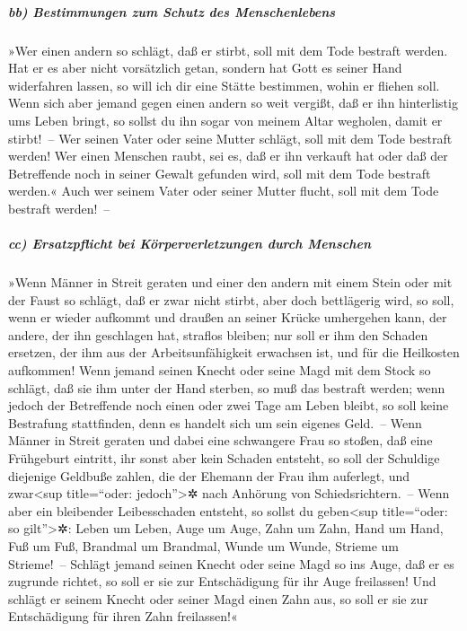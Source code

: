 \hypertarget{bb-bestimmungen-zum-schutz-des-menschenlebens}{%
\subparagraph{bb) Bestimmungen zum Schutz des
Menschenlebens}\label{bb-bestimmungen-zum-schutz-des-menschenlebens}}

 »Wer einen andern so schlägt, daß er stirbt, soll mit
dem Tode bestraft werden.  Hat er es aber nicht
vorsätzlich getan, sondern hat Gott es seiner Hand widerfahren lassen,
so will ich dir eine Stätte bestimmen, wohin er fliehen soll.
 Wenn sich aber jemand gegen einen andern so weit
vergißt, daß er ihn hinterlistig ums Leben bringt, so sollst du ihn
sogar von meinem Altar wegholen, damit er stirbt!~--  Wer
seinen Vater oder seine Mutter schlägt, soll mit dem Tode bestraft
werden!  Wer einen Menschen raubt, sei es, daß er ihn
verkauft hat oder daß der Betreffende noch in seiner Gewalt gefunden
wird, soll mit dem Tode bestraft werden.«  Auch wer
seinem Vater oder seiner Mutter flucht, soll mit dem Tode bestraft
werden!~--

\hypertarget{cc-ersatzpflicht-bei-kuxf6rperverletzungen-durch-menschen}{%
\subparagraph{cc) Ersatzpflicht bei Körperverletzungen durch
Menschen}\label{cc-ersatzpflicht-bei-kuxf6rperverletzungen-durch-menschen}}

 »Wenn Männer in Streit geraten und einer den andern mit
einem Stein oder mit der Faust so schlägt, daß er zwar nicht stirbt,
aber doch bettlägerig wird,  so soll, wenn er wieder
aufkommt und draußen an seiner Krücke umhergehen kann, der andere, der
ihn geschlagen hat, straflos bleiben; nur soll er ihm den Schaden
ersetzen, der ihm aus der Arbeitsunfähigkeit erwachsen ist, und für die
Heilkosten aufkommen!  Wenn jemand seinen Knecht oder
seine Magd mit dem Stock so schlägt, daß sie ihm unter der Hand sterben,
so muß das bestraft werden;  wenn jedoch der Betreffende
noch einen oder zwei Tage am Leben bleibt, so soll keine Bestrafung
stattfinden, denn es handelt sich um sein eigenes Geld.~--
 Wenn Männer in Streit geraten und dabei eine schwangere
Frau so stoßen, daß eine Frühgeburt eintritt, ihr sonst aber kein
Schaden entsteht, so soll der Schuldige diejenige Geldbuße zahlen, die
der Ehemann der Frau ihm auferlegt, und zwar\textless sup title=``oder:
jedoch''\textgreater✲ nach Anhörung von Schiedsrichtern.~--
 Wenn aber ein bleibender Leibesschaden entsteht, so
sollst du geben\textless sup title=``oder: so gilt''\textgreater✲: Leben
um Leben,  Auge um Auge, Zahn um Zahn, Hand um Hand, Fuß
um Fuß,  Brandmal um Brandmal, Wunde um Wunde, Strieme um
Strieme!~--  Schlägt jemand seinen Knecht oder seine Magd
so ins Auge, daß er es zugrunde richtet, so soll er sie zur
Entschädigung für ihr Auge freilassen!  Und schlägt er
seinem Knecht oder seiner Magd einen Zahn aus, so soll er sie zur
Entschädigung für ihren Zahn freilassen!«

